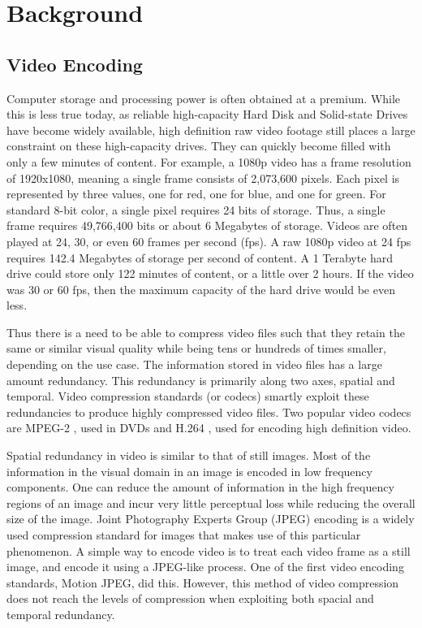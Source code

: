 \chapter{Background}

\section{Video Encoding}

Computer storage and processing power is often obtained at a premium. While this is less true today, as reliable high-capacity Hard Disk and Solid-state Drives have become widely available, high definition raw video footage still places a large constraint on these high-capacity drives. They can quickly become filled with only a few minutes of content. For example, a 1080p video has a frame resolution of 1920x1080, meaning a single frame consists of 2,073,600 pixels. Each pixel is represented by three values, one for red, one for blue, and one for green. For standard 8-bit color, a single pixel requires 24 bits of storage. Thus, a single frame requires 49,766,400 bits or about 6 Megabytes of storage. Videos are often played at 24, 30, or even 60 frames per second (fps). A raw 1080p video at 24 fps requires 142.4 Megabytes of storage per second of content. A 1 Terabyte hard drive could store only 122 minutes of content, or a little over 2 hours. If the video was 30 or 60 fps, then the maximum capacity of the hard drive would be even less.

Thus there is a need to be able to compress video files such that they retain the same or similar visual quality while being tens or hundreds of times smaller, depending on the use case. The information stored in video files has a large amount redundancy. This redundancy is primarily along two axes, spatial and temporal. Video compression standards (or codecs) smartly exploit these redundancies to produce highly compressed video files. Two popular video codecs are MPEG-2 \cite{mpeg2}, used in DVDs and H.264 \cite{h264}, used for encoding high definition video.

Spatial redundancy in video is similar to that of still images. Most of the information in the visual domain in an image is encoded in low frequency components. One can reduce the amount of information in the high frequency regions of an image and incur very little perceptual loss while reducing the overall size of the image. Joint Photography Experts Group (JPEG) encoding is a widely used compression standard for images that makes use of this particular phenomenon. A simple way to encode video is to treat each video frame as a still image, and encode it using a JPEG-like process. One of the first video encoding standards, Motion JPEG, did this. However, this method of video compression does not reach the levels of compression when exploiting both spacial and temporal redundancy.

